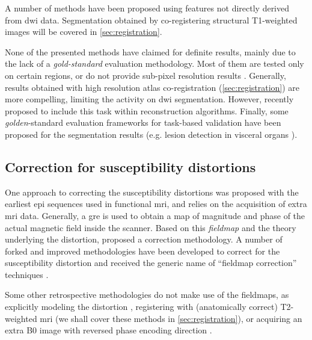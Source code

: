 A number of methods have been proposed using features not directly derived from \gls{dwi} data.
Segmentation obtained by co-registering structural T1-weighted images will be covered in 
\autoref{sec:registration}. 

None of the presented methods have claimed for definite results, mainly due to the lack of 
a \emph{gold-standard} evaluation methodology. Most of them are tested only on certain
regions, or do not provide sub-pixel resolution results
\citep{hadjiprocopis_unbiased_2005,liu_brain_2007,awate_multivariate_2008,lu_segmentation_2008,
han_experimental_2009}. Generally, results obtained with high resolution atlas co-registration
(\autoref{sec:registration}) are more compelling, limiting the activity on \gls{dwi} 
segmentation. However, recently \citep{kumazawa_improvement_2013} proposed to include this
task within reconstruction algorithms. Finally, some \emph{golden}-standard evaluation
frameworks for task-based validation have been proposed for the segmentation results
(e.g. lesion detection in visceral organs \citep{jha_task-based_2012}).

\subsection{Correction for susceptibility distortions}
\label{sec:distortion}

One approach to correcting the susceptibility distortions was proposed
with the earliest \gls{epi} sequences used in functional \gls{mri}, and
relies on the acquisition of extra \gls{mri} data. Generally, a \gls{gre} is used to 
obtain a map of magnitude and phase of the actual magnetic field inside the
scanner. Based on this \emph{fieldmap} and the theory underlying the 
distortion, \citep{jezzard_characterization_2005} proposed a correction 
methodology. A number of forked and improved methodologies have been 
developed to correct for the susceptibility distortion and received the
generic name of ``fieldmap correction'' techniques \cite{hsu_correction_2009,
reber_correction_2005}.

Some other retrospective methodologies do not make use of the fieldmaps, 
as explicitly modeling the distortion \citep{andersson_modeling_2001},
registering with (anatomically correct) T2-weighted \gls{mri} 
\citep{kybic_unwarping_2000,studholme_accurate_2000,li_accounting_2007,
tao_variational_2009} (we shall cover these methods in 
\autoref{sec:registration}), or acquiring an 
extra B0 image with reversed phase encoding direction 
\citep{andersson_how_2003,holland_efficient_2010}.

